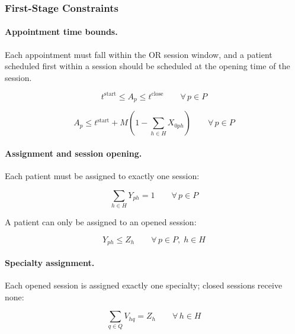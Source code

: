 \subsubsection{First-Stage Constraints}

\paragraph{Appointment time bounds.}

Each appointment must fall within the OR session window, and a patient scheduled
first within a session should be scheduled at the opening time of the session.

\begin{equation}
  t^{\text{start}} \leq A_p \leq t^{\text{close}}
  \qquad \forall\, p \in P
  \label{eq:appt_bounds}
\end{equation}

\begin{equation}
  A_p \leq t^{\text{start}}+M\left(1-\sum_{h \in H}X_{0ph}\right)
  \qquad \forall\, p \in P
  \label{eq:start_first}
\end{equation}

\paragraph{Assignment and session opening.}

Each patient must be assigned to exactly one session:

\begin{equation}
  \sum_{h \in H} Y_{ph} = 1
  \qquad \forall\, p \in P
  \label{eq:assign}
\end{equation}

A patient can only be assigned to an opened session:

\begin{equation}
  Y_{ph} \leq Z_h
  \qquad \forall\, p \in P,\; h \in H
  \label{eq:open}
\end{equation}

\paragraph{Specialty assignment.}

Each opened session is assigned exactly one specialty; closed sessions receive
none:

\begin{equation}
  \sum_{q \in Q} V_{hq} = Z_h
  \qquad \forall\, h \in H
  \label{eq:spec}
\end{equation}

